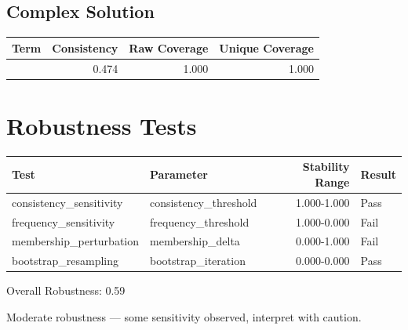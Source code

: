 \documentclass[12pt,a4paper]{article}
\begin{document}
\subsection{Complex Solution}

\begin{tabular}{lrrr}
\toprule
Term & Consistency & Raw Coverage & Unique Coverage \\
\midrule

     & 0.474 & 1.000 & 1.000 \\

\bottomrule
\end{tabular}


\section{Robustness Tests}
\begin{tabular}{llrl}
\toprule
Test & Parameter & Stability Range & Result \\
\midrule
    consistency\_sensitivity & consistency\_threshold & 1.000-1.000 & Pass \\
    frequency\_sensitivity & frequency\_threshold & 1.000-0.000 & Fail \\
    membership\_perturbation & membership\_delta & 0.000-1.000 & Fail \\
    bootstrap\_resampling & bootstrap\_iteration & 0.000-0.000 & Pass \\
\bottomrule
\end{tabular}

Overall Robustness: 0.59

Moderate robustness — some sensitivity observed, interpret with caution.
\end{document}
